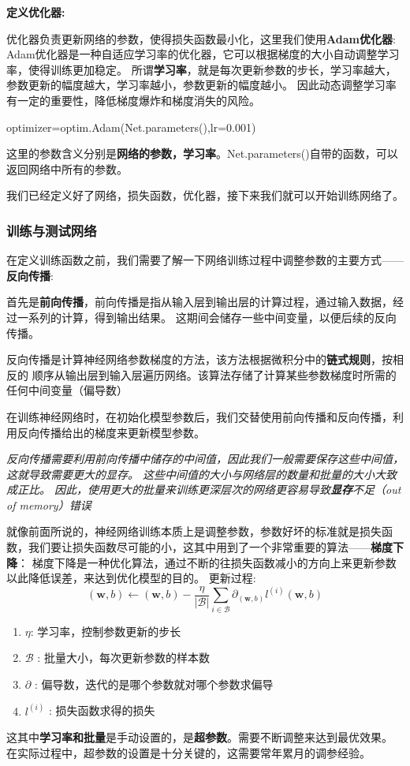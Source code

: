 \textbf{定义优化器:}

优化器负责更新网络的参数，使得损失函数最小化，这里我们使用\textbf{Adam优化器}:
Adam优化器是一种自适应学习率的优化器，它可以根据梯度的大小自动调整学习率，使得训练更加稳定。
所谓\textbf{学习率}，就是每次更新参数的步长，学习率越大，参数更新的幅度越大，学习率越小，参数更新的幅度越小。
因此动态调整学习率有一定的重要性，降低梯度爆炸和梯度消失的风险。

\begin{tpython}
    optimizer=optim.Adam(Net.parameters(),lr=0.001)
\end{tpython}
这里的参数含义分别是\textbf{网络的参数，学习率}。Net.parameters()自带的函数，可以返回网络中所有的参数。

我们已经定义好了网络，损失函数，优化器，接下来我们就可以开始训练网络了。

\subsubsection{训练与测试网络}
在定义训练函数之前，我们需要了解一下网络训练过程中调整参数的主要方式——\textbf{反向传播}:

首先是\textbf{前向传播}，前向传播是指从输入层到输出层的计算过程，通过输入数据，经过一系列的计算，得到输出结果。
这期间会储存一些中间变量，以便后续的反向传播。

反向传播是计算神经网络参数梯度的方法，该方法根据微积分中的\textbf{链式规则}，按相反的
顺序从输出层到输入层遍历网络。该算法存储了计算某些参数梯度时所需的任何中间变量（偏导数）

在训练神经网络时，在初始化模型参数后，我们交替使用前向传播和反向传播，利用反向传播给出的梯度来更新模型参数。

\textit{反向传播需要利用前向传播中储存的中间值，因此我们一般需要保存这些中间值，这就导致需要更大的显存。
这些中间值的大小与网络层的数量和批量的大小大致成正比。
因此，使用更大的批量来训练更深层次的网络更容易导致\textbf{显存}不足（out of memory）错误}

就像前面所说的，神经网络训练本质上是调整参数，参数好坏的标准就是损失函数，我们要让损失函数尽可能的小，这其中用到了一个非常重要的算法——\textbf{梯度下降}：
梯度下降是一种优化算法，通过不断的往损失函数减小的方向上来更新参数以此降低误差，来达到优化模型的目的。
更新过程:
\begin{equation}
    (\textbf{w},b) \longleftarrow (\textbf{w},b) - \frac{\eta}{\left\lvert\mathcal{B}\right\rvert}\sum_{i\in\mathcal{B}}\partial_(\textbf{w},b)l^{(i)}(\textbf{w},b)
\end{equation}
\begin{enumerate}
    \item $\eta$: 学习率，控制参数更新的步长
    \item $\mathcal{B}$ : 批量大小，每次更新参数的样本数
    \item $\partial$ : 偏导数，迭代的是哪个参数就对哪个参数求偏导
    \item $l^{(i)}$ : 损失函数求得的损失
\end{enumerate}
这其中\textbf{学习率和批量}是手动设置的，是\textbf{超参数}。需要不断调整来达到最优效果。
在实际过程中，超参数的设置是十分关键的，这需要常年累月的调参经验。

